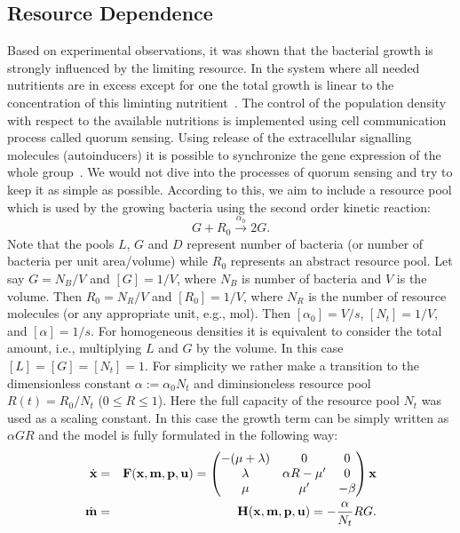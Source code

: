 \documentclass[10pt,A4paper]{article}
\begin{document}
\subsection{Resource Dependence}
Based on experimental observations, it was shown that the bacterial growth is strongly influenced by the limiting resource.
In the system where all needed nutritients are in excess except for one the total growth is linear to the concentration of this liminting nutritient~\cite{hibbing_bacterial_2010, monod_growth_1949}.
The control of the population density with respect to the available nutritions is implemented using cell communication process called quorum sensing. 
Using release of the extracellular signalling molecules (autoinducers) it is possible to synchronize the gene expression of the whole group~\cite{ng_bacterial_2009}.
We would not dive into the processes of quorum sensing and try to keep it as simple as possible.
According to this, we aim to include a resource pool which is used by the growing bacteria using the second order kinetic reaction:
\begin{equation}
    G + R_0  \stackrel{\alpha_0}{\longrightarrow} 2G.
\end{equation}
Note that the pools $L$, $G$ and $D$ represent number of bacteria (or number of bacteria per unit area/volume) while $R_0$ represents an abstract resource pool. 
Let say $G=N_B/V$ and $[G]=1/V$, where $N_B$ is number of bacteria and $V$ is the volume. 
Then $R_0=N_R/V$ and $[R_0]=1/V$, where $N_R$ is the number of resource molecules (or any appropriate unit, e.g., mol). 
Then $[\alpha_0]=V/s$, $[N_t]=1/V$, and $[\alpha]=1/s$. 
For homogeneous densities it is equivalent to consider the total amount, i.e., multiplying $L$ and $G$ by the volume. 
In this case $[L]=[G]=[N_t]=1$.
For simplicity we rather make a transition to the dimensionless constant $\alpha:=\alpha_0 N_t$ and diminsioneless resource pool $R(t) = R_0 / N_t$ ($0 \leqslant R \leqslant 1$).
Here the full capacity of the resource pool $N_t$ was used as a scaling constant.
In this case the growth term can be simply written as $\alpha G R$ and the model is fully formulated in the following way: 
\begin{eqnarray}
    \dot {\mathbf{x}}  &=& \mathbf{F}(\mathbf{x}, \mathbf{m}, \mathbf{p}, \mathbf{u}) = \begin{pmatrix}
        -(\mu + \lambda) & 0               & 0      \\
        \lambda          & \alpha R - \mu' & 0      \\
        \mu              & \mu'            & -\beta 
    \end{pmatrix} \mathbf{x}\\
    \dot {\mathbf{m}} &=& \mathbf{H} (\mathbf{x}, \mathbf{m}, \mathbf{p}, \mathbf{u}) = -\frac{\alpha}{N_t} R G.
\end{eqnarray}
\end{document}
